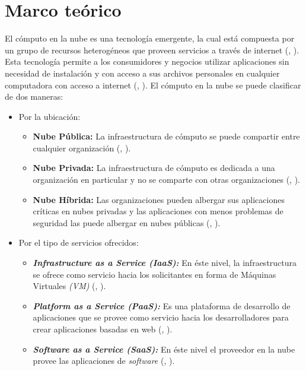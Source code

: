 \section{Marco te\'orico}

El c\'omputo en la nube es una tecnolog\'ia emergente, la cual est\'a compuesta por un grupo de recursos heterog\'eneos que proveen servicios a trav\'es de internet (\citeauthor{agarwal2014efficient}, \citeyear{agarwal2014efficient}).
Esta tecnolog\'ia permite a los consumidores y negocios utilizar aplicaciones sin necesidad de instalaci\'on y con acceso a sus archivos personales en cualquier computadora con acceso a internet (\citeauthor{ahmed2012advanced}, \citeyear{ahmed2012advanced}). 
El c\'omputo en la nube se puede clasificar de dos maneras:
\begin{itemize}
	\item Por la ubicaci\'on: 
	\begin{itemize}
		\item \textbf{Nube P\'ublica:} La infraestructura de c\'omputo se puede compartir entre cualquier organizaci\'on (\citeauthor{ahmed2012advanced}, \citeyear{ahmed2012advanced}).
		\item \textbf{Nube Privada:} La infraestructura de c\'omputo es dedicada a una organizaci\'on en particular y no se comparte con otras organizaciones (\citeauthor{ahmed2012advanced}, \citeyear{ahmed2012advanced}).
		\item \textbf{Nube H\'ibrida:} Las organizaciones pueden albergar sus aplicaciones cr\'iticas en nubes privadas y las aplicaciones con menos problemas de seguridad las puede albergar en nubes p\'ublicas (\citeauthor{ahmed2012advanced}, \citeyear{ahmed2012advanced}).
	\end{itemize}
	\item Por el tipo de servicios ofrecidos: 
	\begin{itemize}
		\item \textit{\textbf{Infrastructure as a Service (IaaS):}} En \'este nivel, la infraestructura se ofrece como servicio hacia los solicitantes en forma de M\'aquinas Virtuales \textit{(VM)} (\citeauthor{agarwal2014efficient}, \citeyear{agarwal2014efficient}).
		\item \textit{\textbf{Platform as a Service (PaaS):}} Es una plataforma de desarrollo de aplicaciones que se provee como servicio hacia los desarrolladores para crear aplicaciones basadas en web (\citeauthor{agarwal2014efficient}, \citeyear{agarwal2014efficient}).
		\item \textit{\textbf{Software as a Service (SaaS):}} En \'este nivel el proveedor en la nube provee las aplicaciones de \textit{software} (\citeauthor{agarwal2014efficient}, \citeyear{agarwal2014efficient}).
	\end{itemize}
\end{itemize}




